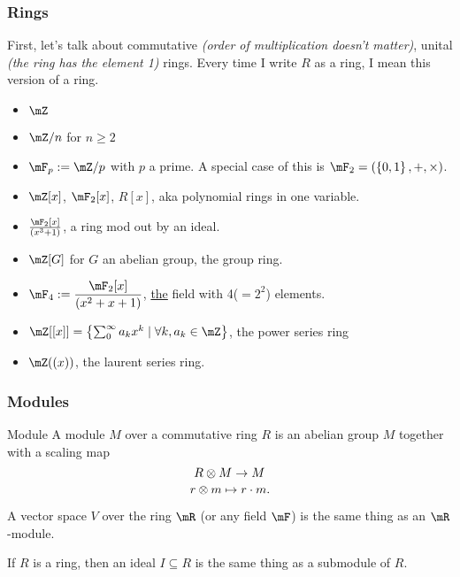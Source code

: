 \subsubsection{Rings}
First, let's talk about commutative \emph{(order of multiplication doesn't matter)}, unital \emph{(the ring has the element 1)} rings. Every time I write $R$ as a ring, I mean this version of a ring. 
\begin{example}{}{}
    \begin{itemize}
        \item $\mZ$
        \item $\mZ/n$ for $n\geq 2$
        \item $\mF_p:=\mZ/p$ with $p$ a prime. A special case of this is $\mF_2 = (\sets{0,1},+,\times)$. 
        \item $\mZ[x]$, $\mF_2[x]$, $R[x]$, aka polynomial rings in one variable. 
        \item $\frac{\mF_2[x]}{(x^3+1)}$, a ring mod out by an ideal. 
        \item $\mZ[G]$ for $G$ an abelian group, the group ring. 
        \item $\ds\mF_4:=\frac{\mF_2[x]}{(x^2+x+1)}$, \ul{the} field with 4($=2^2$) elements. 
        \item $\mZ[[x]] = \sets{\sum_0^\infty a_k x^k\mid \forall k, a_k\in \mZ}$, the power series ring
        \item $\mZ((x))$, the laurent series ring. 
    \end{itemize}
\end{example}
\subsubsection{Modules}
\begin{definition}{Module}
    A {module} $M$ over a commutative ring $R$ is an abelian group $M$ together with a scaling map $$R\otimes M\to M$$ $$r\otimes m\mapsto r\cdot m.$$
\end{definition}
\begin{example}{}{}
    A vector space $V$ over the ring $\mR$ (or any field $\mF$) is the same thing as an $\mR$-module. 
\end{example}
\begin{example}{}{}
    If $R$ is a ring, then an ideal $I\subseteq R$ is the same thing as a submodule of $R$.
\end{example}
